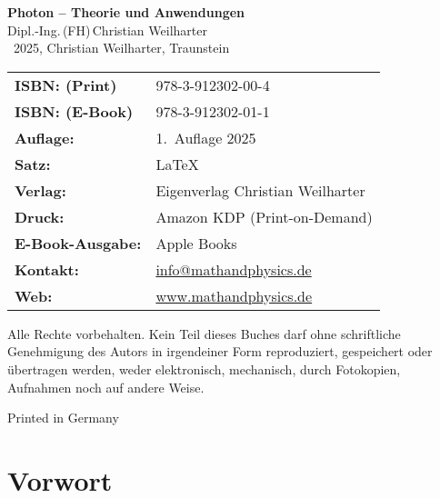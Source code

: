 
\thispagestyle{empty}
\pagestyle{fancy}
\fancyfoot[C]{\thepage}   %
\fancyfoot[L]{}
\fancyfoot[R]{}


\begin{center}


{\Large\textbf{Photon – Theorie und Anwendungen}}\\[1.2em]
{\large Dipl.-Ing.\,(FH)\,Christian Weilharter}\\[1.2em]
\textcopyright~2025, Christian Weilharter, Traunstein\\[2em]
\end{center}
\begin{flushleft}
	\begin{tabular}{@{}l l}
	
	
		\textbf{ISBN: (Print)} & 978-3-912302-00-4 \\[0.5em]
			\textbf{ISBN: (E-Book)} & 978-3-912302-01-1 \\[0.5em]
		\textbf{Auflage:} & 1.~Auflage 2025 \\[0.5em]
		\textbf{Satz:} & \LaTeX \\[0.5em]
		\textbf{Verlag:} & Eigenverlag Christian Weilharter \\[0.5em]
		\textbf{Druck:} & Amazon KDP (Print-on-Demand) \\[0.5em]

			\textbf{E-Book-Ausgabe:} & Apple Books\\[0.5em]
		
		\textbf{Kontakt:} & \href{mailto:info@mathandphysics.de}{info@mathandphysics.de}\\[0.5em]
		\textbf{Web:} & \href{https://www.mathandphysics.de}{www.mathandphysics.de}\\
		

	\end{tabular}
\end{flushleft}

\vspace{2em}
\noindent
Alle Rechte vorbehalten. Kein Teil dieses Buches darf ohne schriftliche Genehmigung des Autors 
in irgendeiner Form reproduziert, gespeichert oder übertragen werden, 
weder elektronisch, mechanisch, durch Fotokopien, Aufnahmen noch auf andere Weise.
\begin{center}\small Printed in Germany\end{center}


\chapter*{Vorwort}



